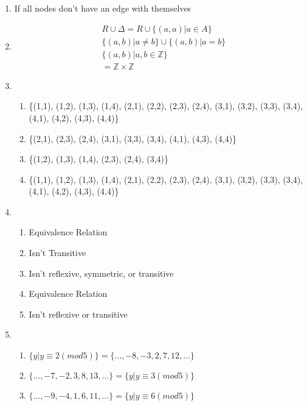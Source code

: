 \documentclass[11pt]{article}
\begin{document}
\begin{enumerate}
    \item If all nodes don't have an edge with themselves
    \item 
        \begin{align*}
            & R \cup \Delta = R \cup \{ (a,a) | a \in A \} \\
            & \{ (a, b) | a \neq b \} \cup \{(a, b) | a = b\}\\
            & \{ (a,b) | a,b \in \mathbb{Z} \} \\
            & = \mathbb{Z} \times  \mathbb{Z}
        \end{align*}
    \item \begin{enumerate}
        \item \{(1,1), (1,2), (1,3), (1,4), (2,1), (2,2), (2,3), (2,4), (3,1),
        (3,2), (3,3), (3,4), (4,1), (4,2), (4,3), (4,4)\}
        \item \{(2,1), (2,3), (2,4), (3,1), (3,3), (3,4), (4,1), (4,3), (4,4)\}
        \item \{(1,2), (1,3), (1,4), (2,3), (2,4), (3,4)\}
        \item \{(1,1), (1,2), (1,3), (1,4), (2,1), (2,2), (2,3), (2,4), (3,1),
        (3,2), (3,3), (3,4), (4,1), (4,2), (4,3), (4,4)\}
    \end{enumerate}
    \item \begin{enumerate}
        \item Equivalence Relation
        \item Isn't Transitive
        \item Isn't reflexive, symmetric, or transitive
        \item Equivalence Relation
        \item Isn't reflexive or transitive
    \end{enumerate}
    \item \begin{enumerate}
        \item $\{y | y \equiv 2(mod 5) \} = \{\dots, -8, -3, 2, 7, 12, \dots\}$
        \item $ \{\dots, -7, -2, 3, 8, 13, \dots\} = \{y|y\equiv 3(mod 5)\}$
        \item $ \{\dots, -9, -4, 1, 6, 11, \dots\} = \{y|y\equiv 6(mod 5)\}$

\end{enumerate}
\end{enumerate}
\end{document}
